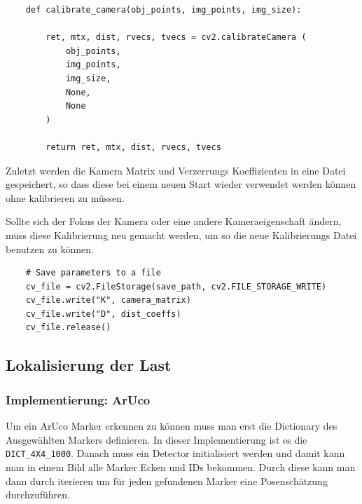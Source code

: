 \begin{lstlisting}
    def calibrate_camera(obj_points, img_points, img_size):

        ret, mtx, dist, rvecs, tvecs = cv2.calibrateCamera (
            obj_points, 
            img_points, 
            img_size, 
            None, 
            None
        )

        return ret, mtx, dist, rvecs, tvecs
\end{lstlisting}


Zuletzt werden die Kamera Matrix und Verzerrungs Koeffizienten in eine Datei gespeichert, so dass 
diese bei einem neuen Start wieder verwendet werden können ohne kalibrieren zu müssen.

Sollte sich der Fokus der Kamera oder eine andere Kameraeigenschaft ändern,
muss diese Kalibrierung neu gemacht werden, um so die neue Kalibrierungs Datei benutzen zu können.


\begin{lstlisting}
    # Save parameters to a file
    cv_file = cv2.FileStorage(save_path, cv2.FILE_STORAGE_WRITE)
    cv_file.write("K", camera_matrix)
    cv_file.write("D", dist_coeffs)
    cv_file.release()
\end{lstlisting}

\clearpage

\subsection{Lokalisierung der Last}

\subsubsection{Implementierung: ArUco}

Um ein ArUco Marker erkennen zu können muss man erst die Dictionary des Ausgewählten Markers definieren. 
In dieser Implementierung ist es die \texttt{DICT\_4X4\_1000}.
Danach muss ein Detector initialisiert werden und damit kann man in einem Bild alle Marker Ecken und IDs bekommen.
Durch diese kann man dann durch iterieren um für jeden gefundenen Marker eine Posenschätzung durchzuführen.



